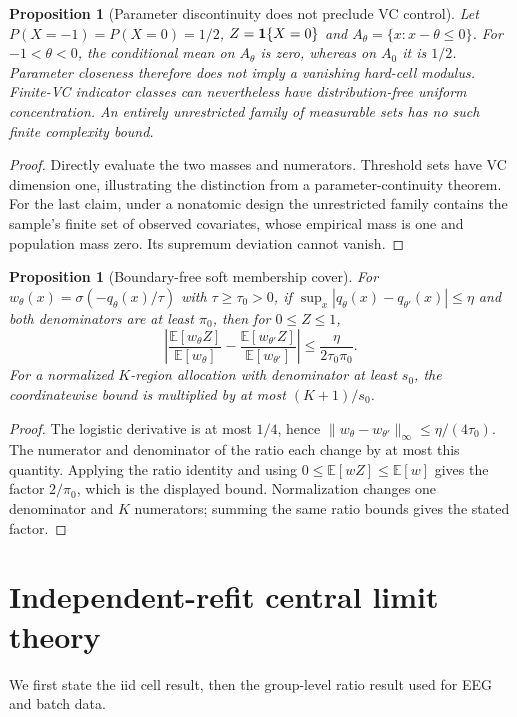 \documentclass[11pt,a4paper]{article}
\newcommand{\E}{\mathbb E}\newcommand{\Pp}{\mathbb P}
\numberwithin{equation}{section}
\newtheorem{proposition}[theorem]{Proposition}
\theoremstyle{definition}\newtheorem{definition}[theorem]{Definition}
\theoremstyle{remark}\newtheorem{remark}[theorem]{Remark}
\begin{document}
\begin{proposition}[Parameter discontinuity does not preclude VC control]\label{prop:atom}
Let $P(X=-1)=P(X=0)=1/2$, $Z=\mathbf 1\{X=0\}$ and
$A_\theta=\{x:x-\theta\le0\}$. For $-1<\theta<0$, the conditional mean on
$A_\theta$ is zero, whereas on $A_0$ it is $1/2$. Parameter closeness therefore
does not imply a vanishing hard-cell modulus. Finite-VC indicator classes can
nevertheless have distribution-free uniform concentration. An entirely
unrestricted family of measurable sets has no such finite complexity bound.
\end{proposition}
\begin{proof}
Directly evaluate the two masses and numerators. Threshold sets have VC dimension
one, illustrating the distinction from a parameter-continuity theorem. For the
last claim, under a nonatomic design the unrestricted family contains the
sample's finite set of observed covariates, whose empirical mass is one and
population mass zero. Its supremum deviation cannot vanish.\end{proof}

\begin{proposition}[Boundary-free soft membership cover]\label{prop:softcover}
For $w_\theta(x)=\sigma(-q_\theta(x)/\tau)$ with $\tau\ge\tau_0>0$, if
$\sup_x|q_\theta(x)-q_{\theta'}(x)|\le\eta$ and both denominators are at least $\pi_0$, then for $0\le Z\le1$,
\[
 \left|\frac{\E[w_\theta Z]}{\E[w_\theta]}-\frac{\E[w_{\theta'}Z]}{\E[w_{\theta'}]}\right|
 \le\frac{\eta}{2\tau_0\pi_0}.
\]
For a normalized $K$-region allocation with denominator at least $s_0$, the coordinatewise bound is multiplied by at most $(K+1)/s_0$.
\end{proposition}
\begin{proof}
The logistic derivative is at most $1/4$, hence $\|w_\theta-w_{\theta'}\|_\infty\le\eta/(4\tau_0)$. The numerator and denominator of the ratio each change by at most this quantity. Applying the ratio identity and using $0\le\E[wZ]\le\E[w]$ gives the factor $2/\pi_0$, which is the displayed bound. Normalization changes one denominator and $K$ numerators; summing the same ratio bounds gives the stated factor.
\end{proof}

\section{Independent-refit central limit theory}\label{sec:clt}
We first state the iid cell result, then the group-level ratio result used for EEG and batch data.
\end{document}
